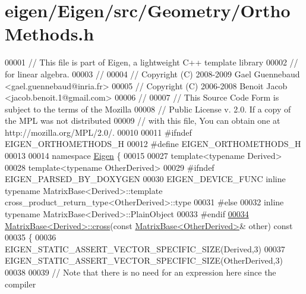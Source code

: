 \hypertarget{eigen_2_eigen_2src_2_geometry_2_ortho_methods_8h_source}{}\section{eigen/\+Eigen/src/\+Geometry/\+Ortho\+Methods.h}
\label{eigen_2_eigen_2src_2_geometry_2_ortho_methods_8h_source}

\begin{DoxyCode}
00001 \textcolor{comment}{// This file is part of Eigen, a lightweight C++ template library}
00002 \textcolor{comment}{// for linear algebra.}
00003 \textcolor{comment}{//}
00004 \textcolor{comment}{// Copyright (C) 2008-2009 Gael Guennebaud <gael.guennebaud@inria.fr>}
00005 \textcolor{comment}{// Copyright (C) 2006-2008 Benoit Jacob <jacob.benoit.1@gmail.com>}
00006 \textcolor{comment}{//}
00007 \textcolor{comment}{// This Source Code Form is subject to the terms of the Mozilla}
00008 \textcolor{comment}{// Public License v. 2.0. If a copy of the MPL was not distributed}
00009 \textcolor{comment}{// with this file, You can obtain one at http://mozilla.org/MPL/2.0/.}
00010 
00011 \textcolor{preprocessor}{#ifndef EIGEN\_ORTHOMETHODS\_H}
00012 \textcolor{preprocessor}{#define EIGEN\_ORTHOMETHODS\_H}
00013 
00014 \textcolor{keyword}{namespace }\hyperlink{namespace_eigen}{Eigen} \{ 
00015 
00027 \textcolor{keyword}{template}<\textcolor{keyword}{typename} Derived>
00028 \textcolor{keyword}{template}<\textcolor{keyword}{typename} OtherDerived>
00029 \textcolor{preprocessor}{#ifndef EIGEN\_PARSED\_BY\_DOXYGEN}
00030 EIGEN\_DEVICE\_FUNC \textcolor{keyword}{inline} \textcolor{keyword}{typename} MatrixBase<Derived>::template 
      cross\_product\_return\_type<OtherDerived>::type
00031 \textcolor{preprocessor}{#else}
00032 \textcolor{keyword}{inline} \textcolor{keyword}{typename} MatrixBase<Derived>::PlainObject
00033 \textcolor{preprocessor}{#endif}
\hyperlink{group___geometry___module_ga4471195b1ba4f30ff6d54e3bc221e197}{00034} \hyperlink{group___core___module_class_eigen_1_1_matrix_base}{MatrixBase<Derived>::cross}(\textcolor{keyword}{const} 
      \hyperlink{group___core___module_class_eigen_1_1_matrix_base}{MatrixBase<OtherDerived>}& other)\textcolor{keyword}{ const}
00035 \textcolor{keyword}{}\{
00036   EIGEN\_STATIC\_ASSERT\_VECTOR\_SPECIFIC\_SIZE(Derived,3)
00037   EIGEN\_STATIC\_ASSERT\_VECTOR\_SPECIFIC\_SIZE(OtherDerived,3)
00038 
00039   \textcolor{comment}{// Note that there is no need for an expression here since the compiler}

\end{DoxyCode}
